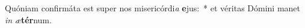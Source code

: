 \item Quóniam confirmáta est super nos misericórdi\textit{a} \textbf{e}jus:~* et véritas Dómini manet \textit{in} \textit{æ}\textbf{tér}num.
